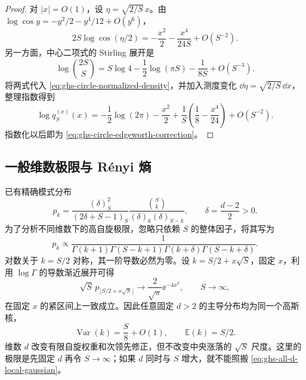 \begin{proof}
对 $|x|=O(1)$，设 $\eta=\sqrt{2/S}\,x$。由 $\log\cos y=-y^2/2-y^4/12+O(y^6)$，
\begin{equation*}
2S\log\cos(\eta/2)
=-\frac{x^2}{2}-\frac{x^4}{24S}+O(S^{-2}).
\end{equation*}
另一方面，中心二项式的 Stirling 展开是
\begin{equation*}
\log\binom{2S}{S}
=S\log4-\frac12\log(\pi S)-\frac1{8S}+O(S^{-3}).
\end{equation*}
将两式代入 \cref{eq:ghs-circle-normalized-density}，并加入测度变化 $\dd\eta=\sqrt{2/S}\,\dd x$，整理指数得到
\begin{equation*}
\log q_S^{(x)}(x)=-\frac12\log(2\pi)-\frac{x^2}2
+\frac1S\left(\frac18-\frac{x^4}{24}\right)+O(S^{-2}).
\end{equation*}
指数化以后即为 \cref{eq:ghs-circle-edgeworth-correction}。
\end{proof}

\subsection{一般维数极限与 Rényi 熵}

已有精确模式分布
\begin{equation}\label{eq:ghs-all-d-onebody-p}
 p_k=\frac{(\delta)_S^2}{(2\delta+S-1)_S}
 \frac{\binom Sk}{(\delta)_k(\delta)_{S-k}},
 \qquad\delta=\frac{d-2}{2}>0.
\end{equation}
为了分析不同维数下的高自旋极限，忽略只依赖 $S$ 的整体因子，将其写为
\begin{equation*}
 p_k\propto\frac1{\Gamma(k+1)\Gamma(S-k+1)
 \Gamma(k+\delta)\Gamma(S-k+\delta)}.
\end{equation*}
对数关于 $k=S/2$ 对称，其一阶导数必然为零。设 $k=S/2+x\sqrt S$，固定 $x$，利用 $\log\Gamma$ 的导数渐近展开可得
\begin{equation}\label{eq:ghs-all-d-local-gaussian}
 \sqrt S\,p_{\lfloor S/2+x\sqrt S\rfloor}
 \longrightarrow\frac2{\sqrt\pi}\ee^{-4x^2},
 \qquad S\to\infty,
\end{equation}
在固定 $x$ 的紧区间上一致成立。因此任意固定 $d>2$ 的主导分布均为同一个高斯核，
\begin{equation}\label{eq:ghs-all-d-asymptotic-variance}
 \operatorname{Var}(k)=\frac S8+O(1),
 \qquad\mathbb E(k)=S/2.
\end{equation}
维数 $d$ 改变有限自旋权重和次领先修正，但不改变中央涨落的 $\sqrt S$ 尺度。这里的极限是先固定 $d$ 再令 $S\to\infty$；如果 $d$ 同时与 $S$ 增大，就不能照搬 \cref{eq:ghs-all-d-local-gaussian}。



